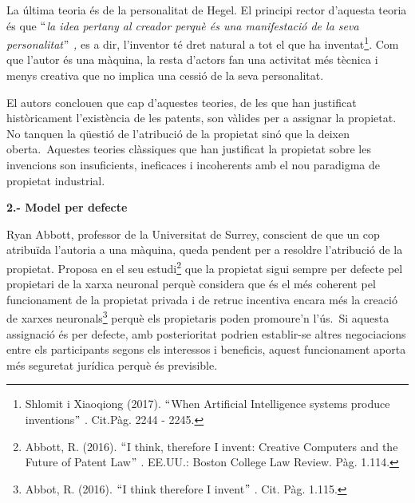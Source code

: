 \documentclass[12pt]{article}
\renewcommand{\_}{\kern-1.5pt\textunderscore\kern-1.5pt}
\begin{document}
\begin{itemize}
\vspace{\baselineskip}
\begin{justify}
La última teoria és de la personalitat de Hegel. El principi rector d’aquesta teoria és que \textit{$``$la idea pertany al creador perquè és una manifestació de la seva personalitat$"$ , }es a dir, l’inventor té dret natural a tot el que ha inventat\footnote{ Shlomit i Xiaoqiong (2017). $``$When Artificial Intelligence systems produce inventions$"$ . Cit.Pàg. 2244 - 2245. }. Com que l’autor és una màquina, la resta d’actors fan una activitat més tècnica i menys creativa que no implica una cessió de la seva personalitat.  
\end{justify}\par


\vspace{\baselineskip}

\vspace{\baselineskip}

\vspace{\baselineskip}
\begin{justify}
El autors conclouen que cap d’aquestes teories, de les que han justificat històricament l’existència de les patents, son vàlides per a assignar la propietat. No tanquen la qüestió  de l’atribució de la propietat sinó que la deixen oberta.\  Aquestes teories clàssiques que han justificat la propietat sobre les invencions son insuficients, ineficaces  i incoherents amb el nou paradigma de propietat industrial. 
\end{justify}\par


\vspace{\baselineskip}
\begin{justify}
\textbf{2.- Model per defecte}
\end{justify}\par


\vspace{\baselineskip}
\begin{justify}
Ryan Abbott, professor de la Universitat de Surrey, conscient de que un cop atribuïda l’autoria a una màquina, queda pendent per a resoldre l’atribució de la propietat. Proposa en el seu estudi\footnote{ Abbott, R. (2016). $``$I think, therefore I invent: Creative Computers and the Future of Patent Law$"$ . EE.UU.: Boston College Law Review. Pàg. 1.114. } que la propietat sigui sempre per defecte pel propietari de la xarxa neuronal perquè considera que és el més coherent pel funcionament de la propietat privada i de retruc incentiva encara més la creació de xarxes neuronals\footnote{ Abbot, R. (2016). $``$I think therefore I invent$"$ . Cit. Pàg. 1.115. } perquè els propietaris poden promoure’n l’ús.\  Si aquesta assignació és per defecte, amb posterioritat podrien establir-se altres negociacions entre els participants segons els interessos i beneficis, aquest funcionament aporta més seguretat jurídica perquè és previsible.
\end{justify}\par



\end{itemize}
\end{document}
